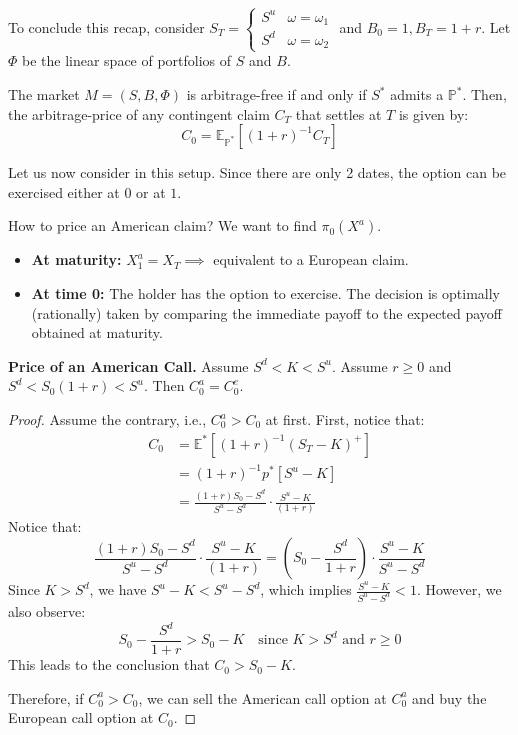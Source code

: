 \begin{proposition}
    To conclude this recap, consider $S_T = \begin{cases} S^u & \omega = \omega_1 \\ S^d & \omega = \omega_2 \end{cases}$ and $B_0 = 1, B_T = 1+r$. Let $\Phi$ be the linear space of portfolios of $S$ and $B$.
    
    The market $M = (S, B, \Phi)$ is arbitrage-free if and only if $S^*$ admits a  $\mathbb{P}^*$. Then, the arbitrage-price of any contingent claim $C_T$ that settles at $T$ is given by:
    \[ C_0 = \mathbb{E}_{\mathbb{P}^*} \left[ (1+r)^{-1} C_T \right] \]
\end{proposition}

\begin{remark}
    Let us now consider  in this setup. Since there are only 2 dates, the option can be exercised either at $0$ or at $1$.
    
    How to price an American claim? We want to find $\pi_0(X^a)$.
    \begin{itemize}
        \item \textbf{At maturity:} $X_1^a = X_T \implies$ equivalent to a European claim.
        \item \textbf{At time 0:} The holder has the option to exercise. The decision is optimally (rationally) taken by comparing the immediate payoff to the expected payoff obtained at maturity.
    \end{itemize}
\end{remark}

\begin{proposition}
    \textbf{Price of an American Call.} Assume $S^d < K < S^u$. Assume $r \geq 0$ and $S^d < S_0(1+r) < S^u$. Then $C_0^a = C_0^e$.
\end{proposition}

\begin{proof}
    Assume the contrary, i.e., $C_0^a > C_0$ at first. First, notice that:
    \begin{align*}
        C_0 &= \mathbb{E}^* \left[ (1+r)^{-1} (S_T - K)^+ \right] \\
        &= (1+r)^{-1} p^* [S^u - K] \\
        &= \frac{(1+r)S_0 - S^d}{S^u - S^d} \cdot \frac{S^u - K}{(1+r)}
    \end{align*}
    Notice that:
    \[ \frac{(1+r)S_0 - S^d}{S^u - S^d} \cdot \frac{S^u - K}{(1+r)} = \left( S_0 - \frac{S^d}{1+r} \right) \cdot \frac{S^u - K}{S^u - S^d} \]
    Since $K > S^d$, we have $S^u - K < S^u - S^d$, which implies $\frac{S^u - K}{S^u - S^d} < 1$. However, we also observe:
    \[ S_0 - \frac{S^d}{1+r} > S_0 - K \quad \text{since } K > S^d \text{ and } r \geq 0 \]
    This leads to the conclusion that $C_0 > S_0 - K$.
    
    Therefore, if $C_0^a > C_0$, we can sell the American call option at $C_0^a$ and buy the European call option at $C_0$.
\end{proof}

